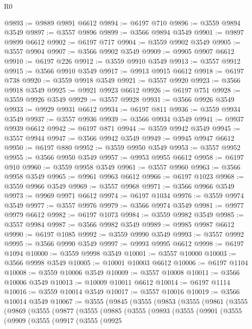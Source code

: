 \begin{lexlean}{R0}
\begin{coremodule}
@9893 := @9889 @9891 @6612
@9894 := @6197 @710
@9896 := @3559 @9894 @3549
@9897 := @3557 @9896
@9899 := @3566 @9894 @3549
@9901 := @9897 @9899 @6612
@9902 := @6197 @717
@9904 := @3559 @9902 @3549
@9905 := @3557 @9904
@9907 := @3566 @9902 @3549
@9909 := @9905 @9907 @6612
@9910 := @6197 @226
@9912 := @3559 @9910 @3549
@9913 := @3557 @9912
@9915 := @3566 @9910 @3549
@9917 := @9913 @9915 @6612
@9918 := @6197 @738
@9920 := @3559 @9918 @3549
@9921 := @3557 @9920
@9923 := @3566 @9918 @3549
@9925 := @9921 @9923 @6612
@9926 := @6197 @751
@9928 := @3559 @9926 @3549
@9929 := @3557 @9928
@9931 := @3566 @9926 @3549
@9933 := @9929 @9931 @6612
@9934 := @6197 @811
@9936 := @3559 @9934 @3549
@9937 := @3557 @9936
@9939 := @3566 @9934 @3549
@9941 := @9937 @9939 @6612
@9942 := @6197 @871
@9944 := @3559 @9942 @3549
@9945 := @3557 @9944
@9947 := @3566 @9942 @3549
@9949 := @9945 @9947 @6612
@9950 := @6197 @880
@9952 := @3559 @9950 @3549
@9953 := @3557 @9952
@9955 := @3566 @9950 @3549
@9957 := @9953 @9955 @6612
@9958 := @6197 @910
@9960 := @3559 @9958 @3549
@9961 := @3557 @9960
@9963 := @3566 @9958 @3549
@9965 := @9961 @9963 @6612
@9966 := @6197 @1023
@9968 := @3559 @9966 @3549
@9969 := @3557 @9968
@9971 := @3566 @9966 @3549
@9973 := @9969 @9971 @6612
@9974 := @6197 @1034
@9976 := @3559 @9974 @3549
@9977 := @3557 @9976
@9979 := @3566 @9974 @3549
@9981 := @9977 @9979 @6612
@9982 := @6197 @1073
@9984 := @3559 @9982 @3549
@9985 := @3557 @9984
@9987 := @3566 @9982 @3549
@9989 := @9985 @9987 @6612
@9990 := @6197 @1085
@9992 := @3559 @9990 @3549
@9993 := @3557 @9992
@9995 := @3566 @9990 @3549
@9997 := @9993 @9995 @6612
@9998 := @6197 @1094
@10000 := @3559 @9998 @3549
@10001 := @3557 @10000
@10003 := @3566 @9998 @3549
@10005 := @10001 @10003 @6612
@10006 := @6197 @1104
@10008 := @3559 @10006 @3549
@10009 := @3557 @10008
@10011 := @3566 @10006 @3549
@10013 := @10009 @10011 @6612
@10014 := @6197 @1114
@10016 := @3559 @10014 @3549
@10017 := @3557 @10016
@10019 := @3566 @10014 @3549
@10067 := @3555
    (@9845
      (@3555
        (@9853
          (@3555
            (@9861
              (@3555
                (@9869
                  (@3555
                    (@9877
                      (@3555
                        (@9885
                          (@3555
                            (@9893
                              (@3555
                                (@9901
                                  (@3555
                                    (@9909
                                      (@3555
                                        (@9917
                                          (@3555
                                            (@9925

\end{coremodule}
\end{lexlean}
